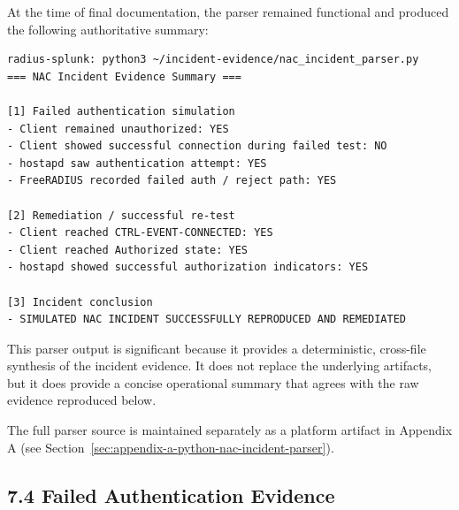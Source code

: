 \documentclass[11pt]{article}
\begin{document}
At the time of final documentation, the parser remained functional and produced the following authoritative summary:


\begin{verbatim}
radius-splunk: python3 ~/incident-evidence/nac_incident_parser.py
=== NAC Incident Evidence Summary ===

[1] Failed authentication simulation
- Client remained unauthorized: YES
- Client showed successful connection during failed test: NO
- hostapd saw authentication attempt: YES
- FreeRADIUS recorded failed auth / reject path: YES

[2] Remediation / successful re-test
- Client reached CTRL-EVENT-CONNECTED: YES
- Client reached Authorized state: YES
- hostapd showed successful authorization indicators: YES

[3] Incident conclusion
- SIMULATED NAC INCIDENT SUCCESSFULLY REPRODUCED AND REMEDIATED
\end{verbatim}

This parser output is significant because it provides a deterministic, cross-file synthesis of the incident evidence. It does not replace the underlying artifacts, but it does provide a concise operational summary that agrees with the raw evidence reproduced below.

The full parser source is maintained separately as a platform artifact in Appendix A (see Section~\ref{sec:appendix-a-python-nac-incident-parser}).


\subsection{7.4 Failed Authentication Evidence}
\label{sec:failed-authentication-evidence}
\end{document}
